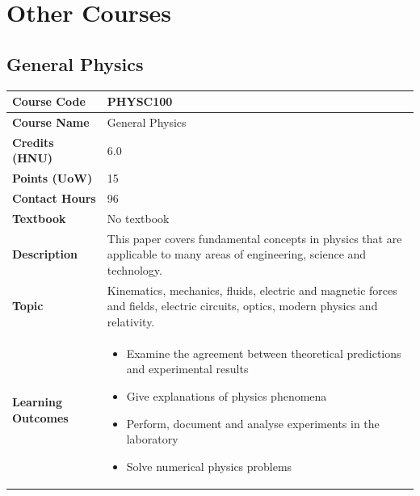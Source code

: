 \documentclass{article}
\begin{document}
\clearpage

\section{Other Courses}

\subsection[PHYSC100 General Physics]{General Physics}
\renewcommand{\arraystretch}{1.5} %
\begin{longtable}{|p{3cm}|p{10cm}|}
\hline
\textbf{Course Code} & PHYSC100 \\
\hline
\textbf{Course Name} & General Physics \\
\hline
\textbf{Credits (HNU)} & 6.0 \\
\hline
\textbf{Points (UoW)} & 15 \\
\hline
\textbf{Contact Hours} & 96 \\
\hline
\textbf{Textbook} & No textbook \\
\hline
\textbf{Description} & This paper covers fundamental concepts in physics that are applicable to many areas of engineering, science and technology.\\
\hline
\textbf{Topic} & Kinematics, mechanics, fluids, electric and magnetic forces and fields, electric circuits, optics, modern physics and relativity. \\
\hline
\textbf{Learning Outcomes} & 
    \begin{itemize}
        \item Examine the agreement between theoretical predictions and experimental results
        \item Give explanations of physics phenomena
        \item Perform, document and analyse experiments in the laboratory
        \item Solve numerical physics problems
    \end{itemize} \\
\hline
\end{longtable}
\end{document}
